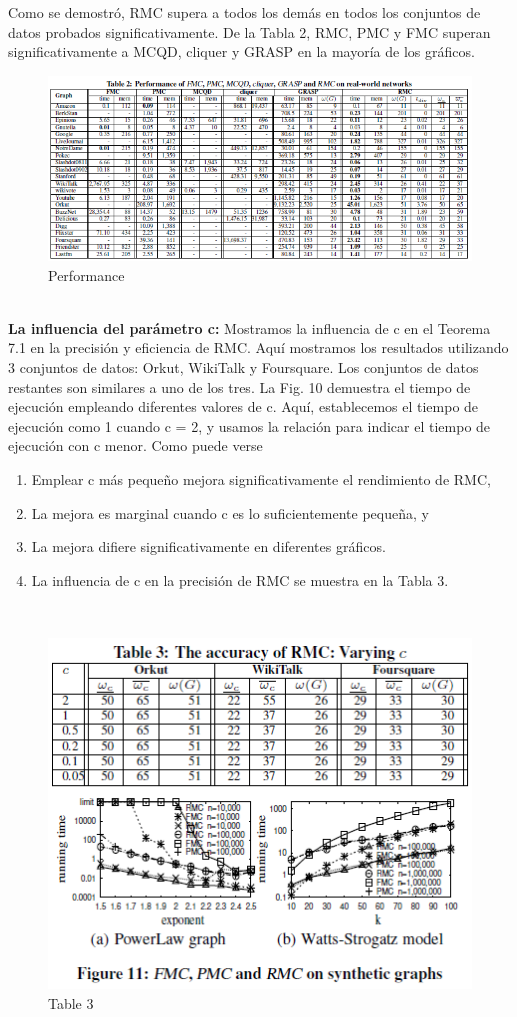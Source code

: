 Como se demostró, RMC supera a todos los demás en todos los conjuntos de datos probados significativamente. De la Tabla 2, RMC, PMC y FMC superan significativamente a MCQD, cliquer y GRASP en la mayoría de los gráficos.
\\
\begin{figure}[h!]
\centering
\includegraphics[scale=.85]{img/imagen19.png}
\caption{Performance}
\label{Comandos}
\end{figure}
\\
\textbf{La influencia del parámetro c:} Mostramos la influencia de c en el Teorema 7.1 en la precisión y eficiencia de RMC. Aquí mostramos los resultados utilizando 3 conjuntos de datos: Orkut, WikiTalk y Foursquare. Los conjuntos de datos restantes son similares a uno de los tres. La Fig. 10 demuestra el tiempo de ejecución empleando diferentes valores de c. Aquí, establecemos el tiempo de ejecución como 1 cuando c = 2, y usamos la relación para indicar el tiempo de ejecución con c menor. Como puede verse
\\
\begin{enumerate}
    \item Emplear c más pequeño mejora significativamente el rendimiento de RMC,
    \item La mejora es marginal cuando c es lo suficientemente pequeña, y
    \item La mejora difiere significativamente en diferentes gráficos.
    \item La influencia de c en la precisión de RMC se muestra en la Tabla 3.
\end{enumerate}
\\
\begin{figure}[h!]
\centering
\includegraphics[scale=1]{img/imagen20.png}
\caption{Table 3}
\label{Comandos}
\end{figure}
\\
